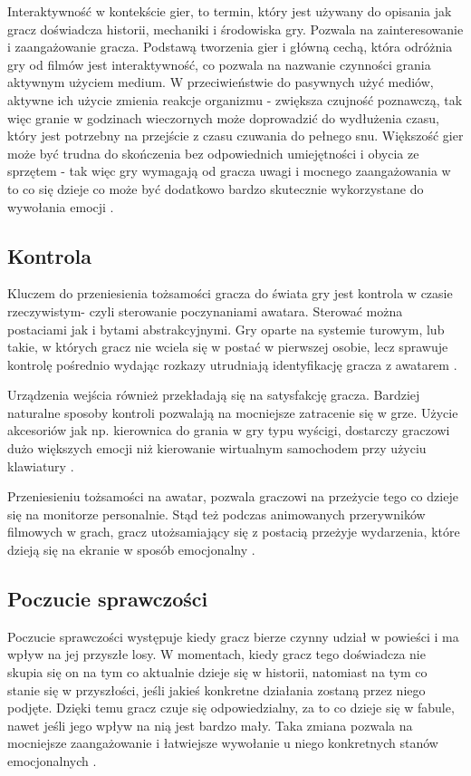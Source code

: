 Interaktywność w kontekście gier, to termin, który jest używany do opisania jak gracz doświadcza historii, mechaniki i środowiska gry. Pozwala na zainteresowanie i zaangażowanie gracza. Podstawą tworzenia gier i główną cechą, która odróżnia gry od filmów jest interaktywność, co pozwala na nazwanie czynności grania aktywnym użyciem medium. W przeciwieństwie do pasywnych użyć mediów, aktywne ich użycie zmienia reakcje organizmu - zwiększa czujność poznawczą, tak więc granie w godzinach wieczornych może doprowadzić do wydłużenia czasu, który jest potrzebny na przejście z czasu czuwania do pełnego snu. Większość gier może być trudna do skończenia bez odpowiednich umiejętności i obycia ze sprzętem - tak więc gry wymagają od gracza uwagi i mocnego zaangażowania w to co się dzieje co może być dodatkowo bardzo skutecznie wykorzystane do wywołania emocji \citep{button, website:interactive}.

\subsection{Kontrola}

Kluczem do przeniesienia tożsamości gracza do świata gry jest kontrola w czasie rzeczywistym- czyli sterowanie poczynaniami awatara. Sterować można postaciami jak i bytami abstrakcyjnymi. Gry oparte na systemie turowym, lub takie, w których gracz nie wciela się w postać w pierwszej osobie, lecz sprawuje kontrolę pośrednio wydając rozkazy utrudniają identyfikację gracza z awatarem \citep{button}.

Urządzenia wejścia również przekładają się na satysfakcję gracza. Bardziej naturalne sposoby kontroli pozwalają na mocniejsze zatracenie się w grze. Użycie akcesoriów jak np. kierownica do grania w gry typu wyścigi, dostarczy graczowi dużo większych emocji niż kierowanie wirtualnym samochodem przy użyciu klawiatury \citep{button}.

Przeniesieniu tożsamości na awatar, pozwala graczowi na przeżycie tego co dzieje się na monitorze personalnie. Stąd też podczas animowanych przerywników filmowych w grach, gracz utożsamiający się z postacią przeżyje wydarzenia, które dzieją się na ekranie w sposób emocjonalny \citep{button, gamefeel}.

\subsection{Poczucie sprawczości}

Poczucie sprawczości występuje kiedy gracz bierze czynny udział w powieści i ma wpływ na jej przyszłe losy. W momentach, kiedy gracz tego doświadcza nie skupia się on na tym co aktualnie dzieje się w historii, natomiast na tym co stanie się w przyszłości, jeśli jakieś konkretne działania zostaną przez niego podjęte. Dzięki temu gracz czuje się odpowiedzialny, za to co dzieje się w fabule, nawet jeśli jego wpływ na nią jest bardzo mały. Taka zmiana pozwala na mocniejsze zaangażowanie i łatwiejsze wywołanie u niego konkretnych stanów emocjonalnych \citep{button, glossary}. 

